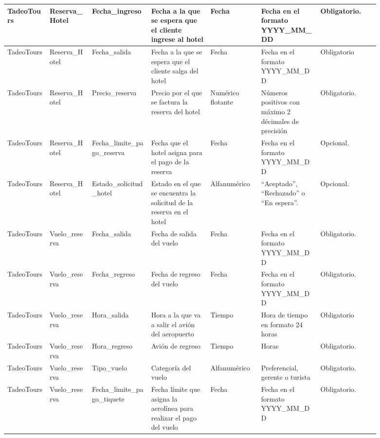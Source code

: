 \documentclass{article}
\begin{document}
\begin{landscape}
\begin{longtable}{|C{0.102\linewidth}|C{0.102\linewidth}|C{0.142\linewidth}|C{0.142\linewidth}|C{0.122\linewidth}|C{0.142\linewidth}|C{0.142\linewidth}|}
TadeoTours & Reserva\_Hotel & Fecha\_ingreso & Fecha a la que se espera que el cliente ingrese al hotel & Fecha & Fecha en el formato YYYY\_MM\_DD & Obligatorio. \\ \hline

TadeoTours & Reserva\_Hotel & Fecha\_salida & Fecha a la que se espera que el cliente salga del hotel & Fecha & Fecha en el formato YYYY\_MM\_DD & Obligatorio \\ \hline

TadeoTours & Reserva\_Hotel & Precio\_reserva & Precio por el que se factura la reserva del hotel & Numérico flotante & Números positivos con máximo 2 décimales de precisión & Obligatorio. \\ \hline

TadeoTours & Reserva\_Hotel & Fecha\_limite\_pago\_reserva & Fecha que el hotel asigna para el pago de la reserva & Fecha & Fecha en el formato YYYY\_MM\_DD & Opcional. \\ \hline

TadeoTours & Reserva\_Hotel & Estado\_solicitud\_hotel & Estado en el que se encuentra la solicitud de la reserva en el hotel & Alfanumérico & ``Aceptado'', ``Rechazado'' o ``En espera''. & Opcional. \\ \hline

TadeoTours & Vuelo\_reserva & Fecha\_salida & Fecha de salida del vuelo & Fecha & Fecha en el formato YYYY\_MM\_DD & Obligatorio. \\ \hline

TadeoTours & Vuelo\_reserva & Fecha\_regreso & Fecha de regreso del vuelo & Fecha & Fecha en el formato YYYY\_MM\_DD & Obligatorio. \\ \hline

TadeoTours & Vuelo\_reserva & Hora\_salida & Hora a la que va a salir el avión del aeropuerto & Tiempo & Hora de tiempo en formato 24 horas & Obligatorio \\ \hline

TadeoTours & Vuelo\_reserva & Hora\_regreso & Avión de regreso & Tiempo & Horas & Obligatorio. \\ \hline

TadeoTours & Vuelo\_reserva & Tipo\_vuelo & Categoría del vuelo & Alfanumérico & Preferencial, gerente o turista & Obligatorio. \\ \hline

TadeoTours & Vuelo\_reserva & Fecha\_limite\_pago\_tiquete & Fecha límite que asigna la aerolínea para realizar el pago del vuelo & Fecha & Fecha en el formato YYYY\_MM\_DD & Obligatorio. \\ \hline


\end{longtable}
\end{landscape}
\end{document}
